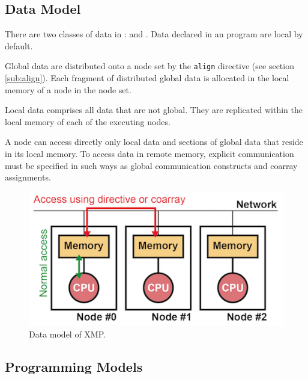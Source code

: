 \subsection{Data Model}

There are two classes of data in {\XMP}: {\it {}} and
{\it {}}. Data declared in an {\XMP} program are local by
default.

Global data are distributed onto a node set by
the {\tt align} directive (see section \ref{sub:align}). Each fragment
of distributed global data is allocated in the local memory of a node in the
node set.

Local data comprises all data that are not global. They are replicated
within the local memory of each of the executing nodes.

A node can access directly only local data and sections of global data
that reside in its local memory.
%
To access data in remote memory, explicit communication must be
specified in such ways as global communication constructs and
coarray assignments.


\begin{figure}
  \centering
  \includegraphics{figs/architecture.png}
  \caption{Data model of XMP.}\label{fig:data_model}
\end{figure}


\subsection{Programming Models}

